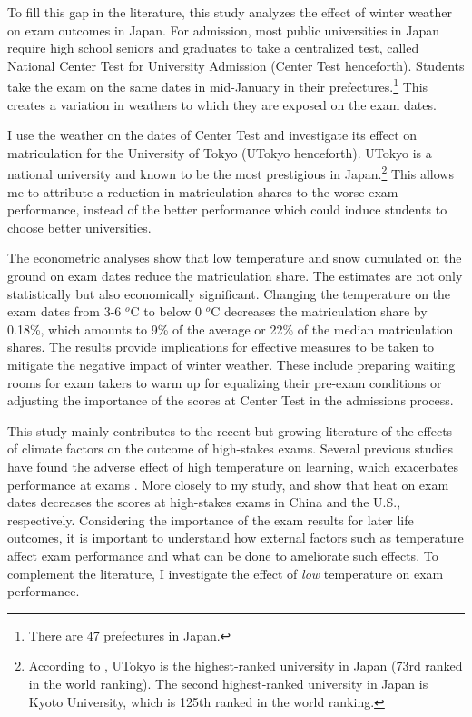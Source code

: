 \documentclass[12pt,letterpaper]{article}
\begin{document}
To fill this gap in the literature, this study analyzes the effect of winter weather on exam outcomes in Japan.
For admission, most public universities in Japan require high school seniors and graduates to take a centralized test, called National Center Test for University Admission (Center Test henceforth).
Students take the exam on the same dates in mid-January in their prefectures.\footnote{
  There are 47 prefectures in Japan.
}
This creates a variation in weathers to which they are exposed on the exam dates.

I use the weather on the dates of Center Test and investigate its effect on matriculation for the University of Tokyo (UTokyo henceforth).
UTokyo is a national university and known to be the most prestigious in Japan.\footnote{
  According to \citet{usnews}, UTokyo is the highest-ranked university in Japan (73rd ranked in the world ranking).
  The second highest-ranked university in Japan is Kyoto University, which is 125th ranked in the world ranking.
}
This allows me to attribute a reduction in matriculation shares to the worse exam performance, instead of the better performance which could induce students to choose better universities.

The econometric analyses show that low temperature and snow cumulated on the ground on exam dates reduce the matriculation share.
The estimates are not only statistically but also economically significant.
Changing the temperature on the exam dates from 3-6 $^o$C to below 0 $^o$C decreases the matriculation share by 0.18\%, which amounts to 9\% of the average or 22\% of the median matriculation shares.
The results provide implications for effective measures to be taken to mitigate the negative impact of winter weather.
These include preparing waiting rooms for exam takers to warm up for equalizing their pre-exam conditions or adjusting the importance of the scores at Center Test in the admissions process.

This study mainly contributes to the recent but growing literature of the effects of climate factors on the outcome of high-stakes exams.
Several previous studies have found the adverse effect of high temperature on learning, which exacerbates performance at exams \citep{Park2020b, Cho2017}.
More closely to my study, \citet{GraffZivin2020} and \citet{Park2020a} show that heat on exam dates decreases the scores at high-stakes exams in China and the U.S., respectively.
Considering the importance of the exam results for later life outcomes, it is important to understand how external factors such as temperature affect exam performance and what can be done to ameliorate such effects.
To complement the literature, I investigate the effect of \textit{low} temperature on exam performance.
\end{document}
